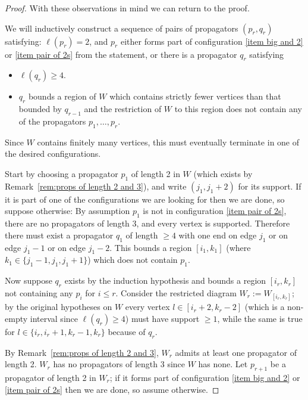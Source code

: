 \documentclass[11pt]{article}
\theoremstyle{remark}
\theoremstyle{definition}
\begin{document}
\begin{proof}
With these observations in mind we can return to the proof.
  
  We will inductively construct a sequence of pairs of propagators $(p_r,q_r)$ satisfying: $\ell(p_r) = 2$, and $p_r$ either forms part of configuration \ref{item big and 2} or \ref{item pair of 2s} from the statement,
  or there is a propagator $q_r$ satisfying
\begin{itemize}
\item $\ell(q_r) \geq 4$.
\item $q_r$ bounds a region of $W$ which contains strictly fewer vertices than that bounded by $q_{r-1}$ and the restriction of $W$ to this region does not contain any of the propagators $p_1, \dots, p_r$.
\end{itemize}
Since $W$ contains finitely many vertices, this must eventually terminate in one of the desired configurations. %

Start by choosing a propagator $p_1$ of length 2 in $W$ (which exists by Remark~\ref{rem:props of length 2 and 3}), and write $(j_1,j_1+2)$ for its support.  If it is part of one of the configurations we are looking for then we are done, 
so suppose otherwise: 
By assumption $p_1$ is not in configuration \ref{item pair of 2s}, there are no propagators of length $3$, and every vertex is supported.  Therefore there must exist a propagator $q_1$ of length $\geq 4$ with one end on edge $j_1$ or on edge $j_1-1$ or on edge $j_1-2$.  This bounds a region $[i_1,k_1]$ (where $k_1 \in \{j_1-1, j_1, j_1+1\}$) which does not contain $p_1$.

Now suppose $q_{r}$ exists by the induction hypothesis and bounds a region $[i_r,k_r]$ not containing any $p_i$ for $i\leq r$.  Consider the restricted diagram $W_r:=W_{[i_r,k_r]}$; by the original hypotheses on $W$ every vertex $l \in [i_r+2,k_r-2]$ (which is a non-empty interval since $\ell(q_r) \geq 4$) must have support $\geq 1$, while the same is true for $l \in \{i_r,i_r+1,k_r-1,k_r\}$ because of $q_r$.  

By Remark~\ref{rem:props of length 2 and 3}, $W_r$ admits at least one propagator of length 2.  $W_r$ has no propagators of length $3$ since $W$ has none.  Let $p_{r+1}$ be a propagator of length 2 in $W_r$; if it forms part of configuration \ref{item big and 2} or \ref{item pair of 2s}
then we are done, so assume otherwise.


\end{proof}
\end{document}
